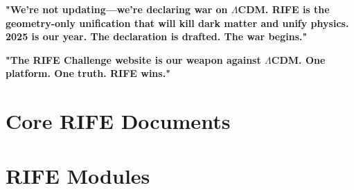 \documentclass[11pt]{report}
\newcommand{\lamcdm}{$\Lambda$CDM}
\begin{document}
\textbf{"We're not updating—we're declaring war on \lamcdm{}. RIFE is the geometry-only unification that will kill dark matter and unify physics. 2025 is our year. The declaration is drafted. The war begins."}

\textbf{"The RIFE Challenge website is our weapon against \lamcdm{}. One platform. One truth. RIFE wins."}

\appendix

\section{Core RIFE Documents}




\section{RIFE Modules}





\end{document}
